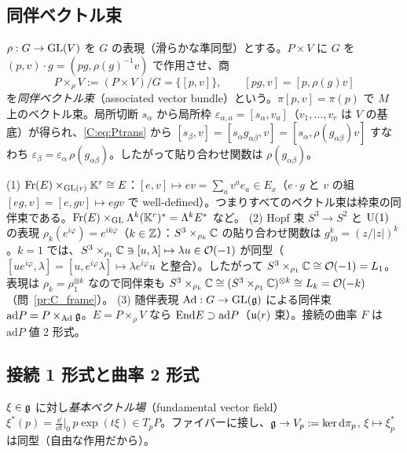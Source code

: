 \subsection{同伴ベクトル束}
$\rho:G\to\mathrm{GL}(V)$ を $G$ の表現（滑らかな準同型）とする。$P\times V$ に $G$ を $(p,v)\cdot g=(pg,\rho(g)^{-1}v)$ で作用させ、商
\[
P\times_\rho V:=(P\times V)/G=\{[p,v]\},\qquad[pg,v]=[p,\rho(g)v]
\]
を\emph{同伴ベクトル束}（associated vector bundle）という。$\pi[p,v]=\pi(p)$ で $M$ 上のベクトル束。局所切断 $s_\alpha$ から局所枠 $\varepsilon_{\alpha,a}=[s_\alpha,v_a]$（$v_1,\dots,v_r$ は $V$ の基底）が得られ、\eqref{C:eq:Ptrans} から $[s_\beta,v]=[s_\alpha g_{\alpha\beta},v]=[s_\alpha,\rho(g_{\alpha\beta})v]$ すなわち $\varepsilon_\beta=\varepsilon_\alpha\,\rho(g_{\alpha\beta})$。したがって貼り合わせ関数は $\rho(g_{\alpha\beta})$。

\begin{ex}\label{C:ex:assoc}
(1) $\operatorname{Fr}(E)\times_{\mathrm{GL}(r)}\mathbb K^r\cong E$：$[e,v]\mapsto ev=\sum_av^ae_a\in E_x$（$e\cdot g$ と $v$ の組 $[eg,v]=[e,gv]\mapsto egv$ で well-defined）。つまりすべてのベクトル束は枠束の同伴束である。$\operatorname{Fr}(E)\times_{\mathrm{GL}}\Lambda^k(\mathbb K^r)^*=\Lambda^kE^*$ など。
(2) Hopf 束 $S^3\to S^2$ と $\mathrm{U}(1)$ の表現 $\rho_k(e^{i\varphi})=e^{ik\varphi}$（$k\in\mathbb Z$）：$S^3\times_{\rho_k}\mathbb C$ の貼り合わせ関数は $g_{10}^k=(z/|z|)^k$。$k=1$ では、$S^3\times_{\rho_1}\mathbb C\ni[u,\lambda]\mapsto\lambda u\in\mathcal O(-1)$ が同型（$[ue^{i\varphi},\lambda]=[u,e^{i\varphi}\lambda]\mapsto\lambda e^{i\varphi}u$ と整合）。したがって $S^3\times_{\rho_1}\mathbb C\cong\mathcal O(-1)=L_1$。表現は $\rho_k=\rho_1^{\otimes k}$ なので同伴束も $S^3\times_{\rho_k}\mathbb C\cong(S^3\times_{\rho_1}\mathbb C)^{\otimes k}\cong L_k=\mathcal O(-k)$（問~\ref{pr:C_frame}）。
(3) 随伴表現 $\mathrm{Ad}:G\to\mathrm{GL}(\mathfrak g)$ による同伴束 $\mathrm{ad}P=P\times_{\mathrm{Ad}}\mathfrak g$。$E=P\times_\rho V$ なら $\mathrm{End} E\supset\mathrm{ad}P$（$\mathfrak{u}(r)$ 束）。接続の曲率 $F$ は $\mathrm{ad}P$ 値 2 形式。
\end{ex}

\subsection{接続 1 形式と曲率 2 形式}
$\xi\in\mathfrak g$ に対し\emph{基本ベクトル場}（fundamental vector field）$\xi^*(p)=\frac{\dd}{\dd t}\big|_{0}\,p\exp(t\xi)\in T_pP$。ファイバーに接し、$\mathfrak g\to V_p:=\ker\mathrm{d}\pi_p$, $\xi\mapsto\xi^*_p$ は同型（自由な作用だから）。

